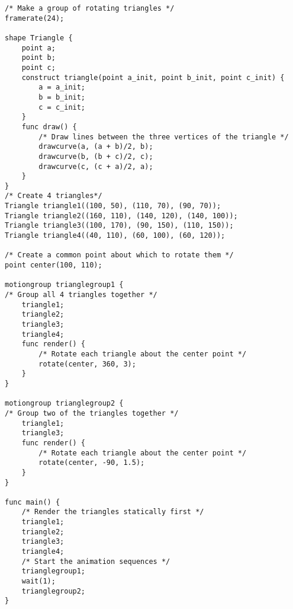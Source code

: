 \documentclass[letterpaper,12pt]{article}
\begin{document}
\begin{lstlisting}
/* Make a group of rotating triangles */
framerate(24);

shape Triangle {
	point a;
	point b;
	point c;
	construct triangle(point a_init, point b_init, point c_init) {
	    a = a_init;
	    b = b_init;
	    c = c_init;
	}
	func draw() {
	    /* Draw lines between the three vertices of the triangle */
	    drawcurve(a, (a + b)/2, b);
	    drawcurve(b, (b + c)/2, c);
		drawcurve(c, (c + a)/2, a);
	}
}
/* Create 4 triangles*/
Triangle triangle1((100, 50), (110, 70), (90, 70));
Triangle triangle2((160, 110), (140, 120), (140, 100));
Triangle triangle3((100, 170), (90, 150), (110, 150));
Triangle triangle4((40, 110), (60, 100), (60, 120));

/* Create a common point about which to rotate them */
point center(100, 110);

motiongroup trianglegroup1 {
/* Group all 4 triangles together */
    triangle1;
	triangle2;
	triangle3;
	triangle4;
	func render() {
	    /* Rotate each triangle about the center point */
	    rotate(center, 360, 3);
	}
}

motiongroup trianglegroup2 {
/* Group two of the triangles together */
    triangle1;
	triangle3;
	func render() {
	    /* Rotate each triangle about the center point */
	    rotate(center, -90, 1.5);
	}
}

func main() {
    /* Render the triangles statically first */
    triangle1;
    triangle2;
    triangle3;
    triangle4;
    /* Start the animation sequences */
	trianglegroup1;
	wait(1);
	trianglegroup2;
}
\end{lstlisting}
\end{document}

